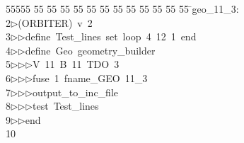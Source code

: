 %
%
\begin{tabbing}
55555 \= 55 \= 55 \= 55 \= 55 \= 55 \= 55 \= 55 \= 55 \= 55 \= 55 \= 55 \= 55 \= \>geo\_11\_3:\\[0pt]
2\>$\triangleright$\>(ORBITER)\ v\ 2\ \\[0pt]
3\>$\triangleright$\>$\triangleright$\>define\ Test\_lines\ set\ loop\ 4\ 12\ 1\ end\ \\[0pt]
4\>$\triangleright$\>$\triangleright$\>define\ Geo\ geometry\_builder\ \\[0pt]
5\>$\triangleright$\>$\triangleright$\>$\triangleright$\>V\ 11\ B\ 11\ TDO\ 3\ \\[0pt]
6\>$\triangleright$\>$\triangleright$\>$\triangleright$\>fuse\ 1\ fname\_GEO\ 11\_3\ \\[0pt]
7\>$\triangleright$\>$\triangleright$\>$\triangleright$\>output\_to\_inc\_file\ \\[0pt]
8\>$\triangleright$\>$\triangleright$\>$\triangleright$\>test\ Test\_lines\ \\[0pt]
9\>$\triangleright$\>$\triangleright$\>end\\[0pt]
10\>\end{tabbing}
